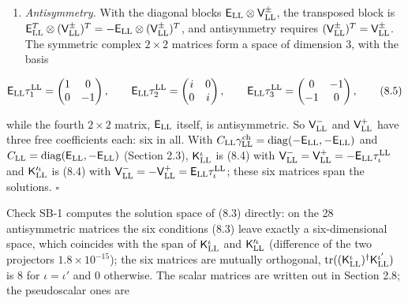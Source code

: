 \documentclass[
  10pt,
]{article}
\begin{document}
\begin{enumerate}
  turns \(\mathsf E_{\rm LL}\) into
  \(\mathrm{diag}(1/\sqrt2,\sqrt2)\,\mathsf E_{\rm LL}\,\mathrm{diag}(\sqrt2,1/\sqrt2)=\begin{pmatrix}0&\tfrac12\\-2&0\end{pmatrix}\neq\mathsf E_{\rm LL}\),
  so the multiple is zero. The blocks between the two Weyl spinors
  vanish: a Lorentz-invariant pair never joins a left-handed with a
  right-handed charge.
\item
  \emph{Antisymmetry.} With the diagonal blocks
  \(\mathsf E_{\rm LL}\otimes\mathsf V^\pm_{\rm LL}\), the transposed
  block is
  \(\mathsf E^T_{\rm LL}\otimes(\mathsf V^\pm_{\rm LL})^T=-\mathsf E_{\rm LL}\otimes(\mathsf V^\pm_{\rm LL})^T\),
  and antisymmetry requires
  \((\mathsf V^\pm_{\rm LL})^T=\mathsf V^\pm_{\rm LL}\). The symmetric
  complex \(2\times2\) matrices form a space of dimension 3, with the
  basis
\end{enumerate}

\[\mathsf E_{\rm LL}\tau^{\rm LL}_1=\begin{pmatrix}1&0\\0&-1\end{pmatrix},\qquad\mathsf E_{\rm LL}\tau^{\rm LL}_2=\begin{pmatrix}i&0\\0&i\end{pmatrix},\qquad\mathsf E_{\rm LL}\tau^{\rm LL}_3=\begin{pmatrix}0&-1\\-1&0\end{pmatrix},\tag{8.5}\]

while the fourth \(2\times2\) matrix, \(\mathsf E_{\rm LL}\) itself, is
antisymmetric. So \(\mathsf V^-_{\rm LL}\) and \(\mathsf V^+_{\rm LL}\)
have three free coefficients each: six in all. With
\(C_{\rm LL}\gamma^{\rm ch}_{\rm LL}=\mathrm{diag}(-\mathsf E_{\rm LL},-\mathsf E_{\rm LL})\)
and \(C_{\rm LL}=\mathrm{diag}(\mathsf E_{\rm LL},-\mathsf E_{\rm LL})\)
(Section 2.3), \(\mathsf K^\iota_{\rm LL}\) is (8.4) with
\(\mathsf V^-_{\rm LL}=\mathsf V^+_{\rm LL}=-\mathsf E_{\rm LL}\tau^{\rm LL}_\iota\)
and \(\mathsf K'^\iota_{\rm LL}\) is (8.4) with
\(\mathsf V^-_{\rm LL}=-\mathsf V^+_{\rm LL}=\mathsf E_{\rm LL}\tau^{\rm LL}_\iota\);
these six matrices span the solutions. \(\square\)

Check SB-1 computes the solution space of (8.3) directly: on the 28
antisymmetric matrices the six conditions (8.3) leave exactly a
six-dimensional space, which coincides with the span of
\(\mathsf K^\iota_{\rm LL}\) and \(\mathsf K'^\iota_{\rm LL}\)
(difference of the two projectors \(1.8\times10^{-15}\)); the six
matrices are mutually orthogonal,
\(\mathrm{tr}((\mathsf K^\iota_{\rm LL})^\dagger\mathsf K^{\iota'}_{\rm LL})\)
is 8 for \(\iota=\iota'\) and 0 otherwise. The scalar matrices are
written out in Section 2.8; the pseudoscalar ones are
\end{document}
